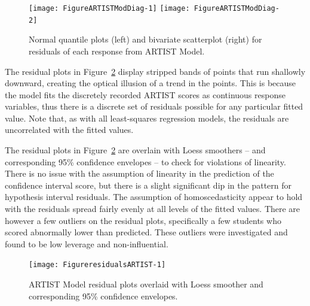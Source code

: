 \documentclass[11pt]{isuthesis}\usepackage[]{graphicx}\usepackage[]{color}
\newenvironment{knitrout}{}{} %
\begin{document}
\begin{appendices}
\begin{knitrout}
\color{fgcolor}\begin{figure}[h]

{\centering \texttt{[image: FigureARTISTModDiag-1]} 
\texttt{[image: FigureARTISTModDiag-2]} 

}

\caption[Normal quantile plots (left) and bivariate scatterplot (right) for residuals of each response from ARTIST Model]{Normal quantile plots (left) and bivariate scatterplot (right) for residuals of each response from ARTIST Model.}\label{fig:ARTISTModDiag}
\end{figure}


\end{knitrout}

The residual plots in Figure~\ref{fig:residualsARTIST} display stripped bands of points that run shallowly downward, creating the optical illusion of a trend in the points.  This is because the model fits the discretely recorded ARTIST scores as continuous response variables, thus there is a discrete set of residuals possible for any particular fitted value.  Note that, as with all least-squares regression models, the residuals are uncorrelated with the fitted values. 

The residual plots in Figure~\ref{fig:residualsARTIST} are overlain with Loess smoothers -- and corresponding 95\% confidence envelopes -- to check for violations of linearity.  There is no issue with the assumption of linearity in the prediction of the confidence interval score, but there is a slight significant dip in the pattern for hypothesis interval residuals.  The assumption of homoscedasticity appear to hold with the residuals spread fairly evenly at all levels of the fitted values. There are however a few outliers on the residual plots, specifically a few students who scored abnormally lower than predicted. These outliers were investigated and found to be low leverage and non-influential. 

\begin{knitrout}
\color{fgcolor}\begin{figure}[h]

{\centering \texttt{[image: FigureresidualsARTIST-1]} 

}

\caption[ARTIST Model residual plots overlaid with Loess smoother and corresponding 95\% confidence envelopes]{ARTIST Model residual plots overlaid with Loess smoother and corresponding 95\% confidence envelopes.}\label{fig:residualsARTIST}
\end{figure}



\end{knitrout}
\end{appendices}
\end{document}
